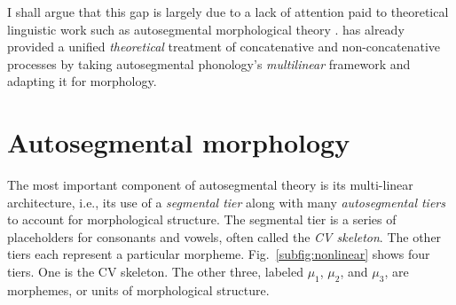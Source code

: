 I shall argue that this gap is largely due to a lack of attention paid to 
theoretical linguistic work such as
autosegmental morphological theory \citep{mccarthy:1981}.
\cite{mccarthy:1981} has already provided a unified \emph{theoretical} 
treatment of concatenative 
and non-concatenative processes by taking autosegmental phonology's 
\emph{multilinear} framework and adapting it for morphology. 

%

\section{Autosegmental morphology}
\label{sec:autoseg-morph}
The most important component of autosegmental theory \citep{mccarthy:1981}
is its multi-linear architecture, i.e., its
use of a \emph{segmental tier} along with many \emph{autosegmental tiers} to account for morphological structure. The segmental tier is
a series of placeholders for consonants and vowels, often called the
\emph{CV skeleton}. The other tiers each represent a particular
morpheme. Fig.~\ref{subfig:nonlinear} shows four tiers. One is the CV
skeleton. The other three, labeled $\mu_1$, $\mu_2$, and $\mu_3$, are
morphemes, or units of morphological structure.

